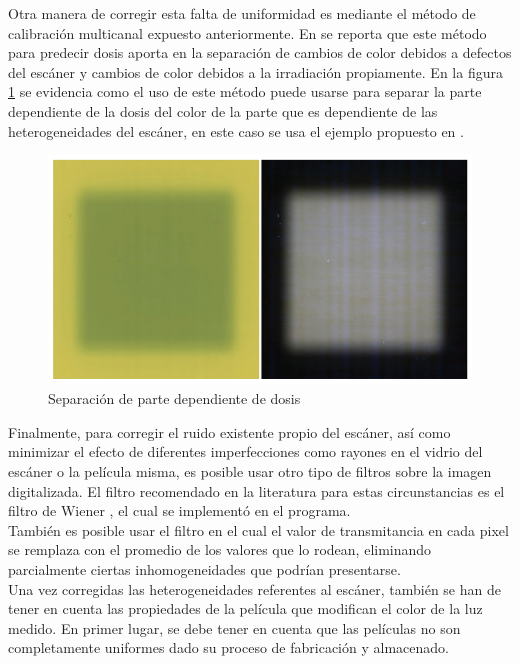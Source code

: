Otra manera de corregir esta falta de uniformidad es mediante el método de calibración multicanal expuesto anteriormente. En \cite{Micke2011} se reporta que este método para predecir dosis aporta en la separación de cambios de color debidos a defectos del escáner y cambios de color debidos a la irradiación propiamente. En la figura \ref{fig:Multicanal} se evidencia como el uso de este método puede usarse para separar la parte dependiente de la dosis del color de la parte que es dependiente de las heterogeneidades del escáner, en este caso se usa el ejemplo propuesto en \cite{Micke2011}. \\

\begin{figure}
	\centering
	\includegraphics[width=0.7\linewidth]{images/imagenMicke.png}
	
	\caption{Separación de parte dependiente de dosis\cite{Micke2011}}
	\label{fig:Multicanal}
\end{figure}

Finalmente, para corregir el ruido existente propio del escáner, así como minimizar el efecto de diferentes imperfecciones como rayones en el vidrio del escáner o la película misma, es posible usar otro tipo de filtros sobre la imagen digitalizada. El filtro recomendado en la literatura para estas circunstancias es el filtro de Wiener \cite{Devic2016}, el cual se implementó en el programa. \\

También es posible usar el filtro en el cual el valor de transmitancia en cada pixel se remplaza con el promedio de los valores que lo rodean, eliminando parcialmente ciertas inhomogeneidades que podrían presentarse.\\

Una vez corregidas las heterogeneidades referentes al escáner, también se han de tener en cuenta las propiedades de la película que modifican el color de la luz medido. En primer lugar, se debe tener en cuenta que las películas no son completamente uniformes dado su proceso de fabricación y almacenado.\\

